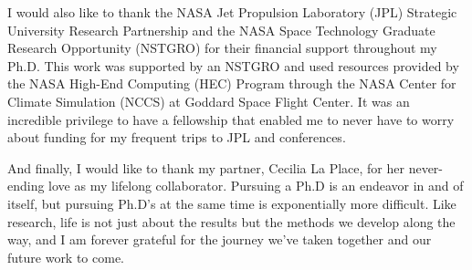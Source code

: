 I would also like to thank the NASA Jet Propulsion Laboratory (JPL) Strategic University Research Partnership and the NASA Space Technology Graduate Research Opportunity (NSTGRO) for their financial support throughout my Ph.D. 
This work was supported by an NSTGRO and used resources provided by the NASA High-End Computing (HEC) Program through the NASA Center for Climate Simulation (NCCS) at Goddard Space Flight Center.
It was an incredible privilege to have a fellowship that enabled me to never have to worry about funding for my frequent trips to JPL and conferences.

And finally, I would like to thank my partner, Cecilia La Place, for her never-ending love as my lifelong collaborator. 
Pursuing a Ph.D is an endeavor in and of itself, but pursuing Ph.D's at the same time is exponentially more difficult.
Like research, life is not just about the results but the methods we develop along the way, and I am forever grateful for the journey we've taken together and our future work to come.